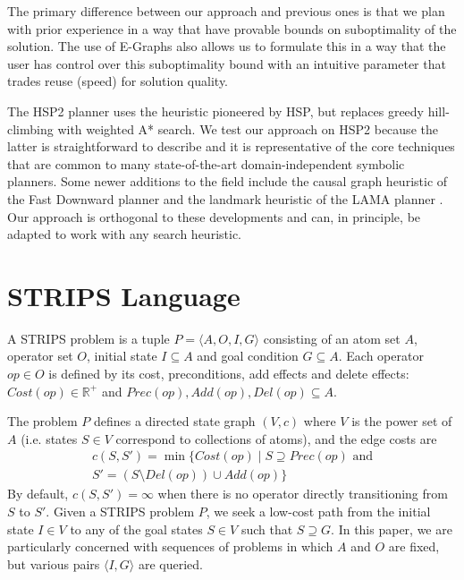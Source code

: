 \documentclass[letterpaper]{article}
\begin{document}
The primary difference between our approach and previous ones 
is that we plan with prior experience in a way that have provable
bounds on suboptimality of the solution. The use of E-Graphs also
allows us to formulate this in a way that the user has control over
this suboptimality bound with an intuitive parameter that trades
reuse (speed) for solution quality.

The HSP2 \cite{bonet2001planning} planner uses the heuristic pioneered by HSP, but replaces greedy hill-climbing with weighted A* search.
We test our approach on HSP2 because the latter is straightforward to describe and it is representative of the core techniques that are common to many state-of-the-art domain-independent symbolic planners.
Some newer additions to the field include the causal graph heuristic of the Fast Downward planner \cite{helmert2006fast} and the landmark heuristic of the LAMA planner \cite{richter2010lama}. Our approach is orthogonal to these developments and can, in principle, be adapted to work with any search heuristic.

\section{STRIPS Language}

A STRIPS problem is a tuple $P = \langle A,O,I,G\rangle$ consisting of an atom set $A$, operator set $O$, initial state $I \subseteq A$ and goal condition $G \subseteq A$.
Each operator $op\in O$ is defined by its cost, preconditions, add effects and delete effects: $Cost(op) \in \mathbb{R}^+$ and $Prec(op),Add(op),Del(op) \subseteq A$.

The problem $P$ defines a directed state graph $(V,c)$ where $V$ is the power set of $A$ (i.e. states $S\in V$ correspond to collections of atoms), and the edge costs are
\begin{eqnarray*} c(S,S') = \min\{Cost(op) \mid S\supseteq Prec(op)\text{ and}
\\S' = \left(S \setminus Del(op)\right) \cup Add(op)\} \end{eqnarray*}
By default, $c(S,S') = \infty$ when there is no operator directly transitioning from $S$ to $S'$.
Given a STRIPS problem $P$, we seek a low-cost path from the initial state $I\in V$ to any of the goal states $S\in V$ such that $S \supseteq G$. In this paper, we are particularly concerned with sequences of problems in which $A$ and $O$ are fixed, but various pairs $\langle I,G\rangle$ are queried.
\end{document}
